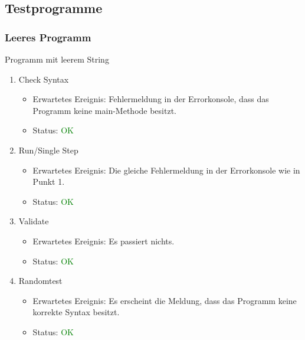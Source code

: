 \subsection{Testprogramme}
\subsubsection{Leeres Programm}
Programm mit leerem String
\begin{enumerate}
\item Check Syntax
\begin{itemize}
\item Erwartetes Ereignis: Fehlermeldung in der Errorkonsole, dass das Programm keine main-Methode besitzt. 
\item Status: \textcolor{green}{OK}
\end{itemize}
\item Run/Single Step
\begin{itemize}
\item Erwartetes Ereignis: Die gleiche Fehlermeldung in der Errorkonsole wie in Punkt 1. 
\item Status: \textcolor{green}{OK}
\end{itemize}
\item Validate
\begin{itemize}
\item Erwartetes Ereignis: Es passiert nichts. 
\item Status: \textcolor{green}{OK}
\end{itemize}
\item Randomtest
\begin{itemize}
\item Erwartetes Ereignis: Es erscheint die Meldung, dass das Programm keine korrekte Syntax besitzt. 
\item Status: \textcolor{green}{OK}
\end{itemize}
\end{enumerate}
